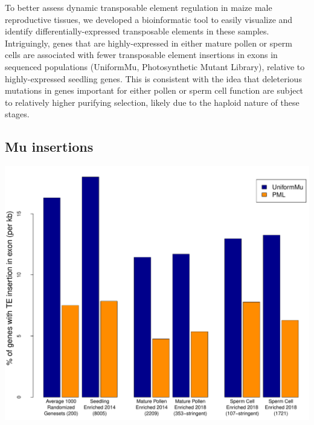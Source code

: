 \documentclass[a0,30pt]{sciposter}
\newlength{\figwidth}
\begin{document}
\begin{multicols}{3}
  To better assess dynamic transposable element regulation in maize male reproductive tissues, we developed a bioinformatic tool to easily visualize and identify differentially-expressed
  transposable elements in these samples. Intriguingly, genes that are highly-expressed in either mature pollen or sperm cells are associated with fewer transposable element insertions in
  exons in sequenced populations (UniformMu, Photosynthetic Mutant Library), relative to highly-expressed seedling genes.
  This is consistent with the idea that deleterious mutations in genes important for either pollen or sperm cell function are subject to relatively higher purifying selection, likely due to the haploid 
  nature of these stages.

  \subsection*{Mu insertions}

  \begin{center}
    \includegraphics[width=\figwidth]{rrm-barplot.pdf}
  \end{center}


\end{multicols}
\end{document}
